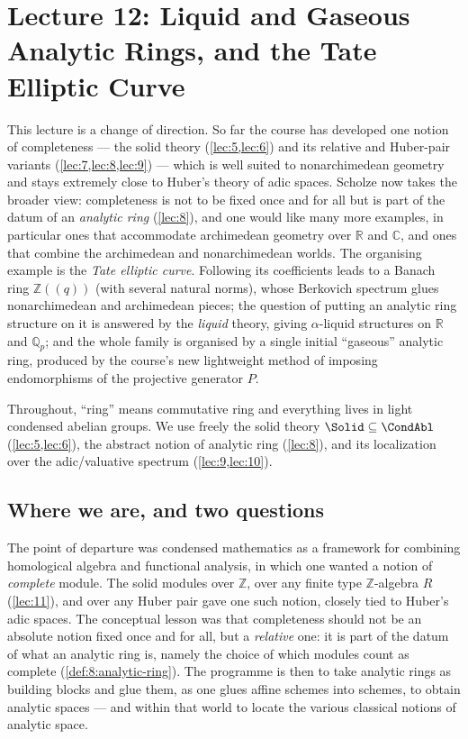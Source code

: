 \section{Lecture 12: Liquid and Gaseous Analytic Rings, and the Tate Elliptic Curve}
\label{lec:12}

This lecture is a change of direction. So far the course has developed one
notion of completeness --- the solid theory (\cref{lec:5,lec:6}) and its
relative and Huber-pair variants (\cref{lec:7,lec:8,lec:9}) --- which is
well suited to nonarchimedean geometry and stays extremely close to Huber's
theory of adic spaces. Scholze now takes the broader view: completeness is not
to be fixed once and for all but is part of the datum of an \emph{analytic ring}
(\cref{lec:8}), and one would like many more examples, in particular ones that
accommodate archimedean geometry over $\mathbb{R}$ and $\mathbb{C}$, and ones
that combine the archimedean and nonarchimedean worlds. The organising example
is the \emph{Tate elliptic curve}. Following its coefficients leads to a Banach
ring $\mathbb{Z}(\!(q)\!)$ (with several natural norms), whose Berkovich
spectrum glues nonarchimedean and archimedean pieces; the question of putting an
analytic ring structure on it is answered by the \emph{liquid} theory, giving
$\alpha$-liquid structures on $\mathbb{R}$ and $\mathbb{Q}_p$; and the whole
family is organised by a single initial ``gaseous'' analytic ring, produced by
the course's new lightweight method of imposing endomorphisms of the projective
generator $P$.

Throughout, ``ring'' means commutative ring and everything lives in light
condensed abelian groups. We use freely the solid theory
$\Solid\subseteq\CondAbl$ (\cref{lec:5,lec:6}), the abstract notion of analytic
ring (\cref{lec:8}), and its localization over the adic/valuative spectrum
(\cref{lec:9,lec:10}).

\subsection{Where we are, and two questions}

\begin{remark}
\label{rmk:12:relative-completeness}
The point of departure was condensed mathematics as a framework for combining
homological algebra and functional analysis, in which one wanted a notion of
\emph{complete} module. The solid modules over $\mathbb{Z}$, over any finite type
$\mathbb{Z}$-algebra $R$ (\cref{lec:11}), and over any Huber pair gave one such
notion, closely tied to Huber's adic spaces. The conceptual lesson was that
completeness should not be an absolute notion fixed once and for all, but a
\emph{relative} one: it is part of the datum of what an analytic ring is,
namely the choice of which modules count as complete (\cref{def:8:analytic-ring}).
The programme is then to take analytic rings as building blocks and glue them,
as one glues affine schemes into schemes, to obtain analytic spaces --- and
within that world to locate the various classical notions of analytic space.
\end{remark}

